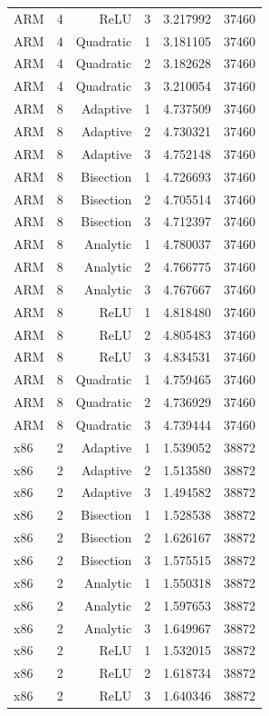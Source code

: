 {\begin{longtable}{lrrrrr}
ARM & 4 & ReLU & 3 & 3.217992 & 37460 \\
ARM & 4 & Quadratic & 1 & 3.181105 & 37460 \\
ARM & 4 & Quadratic & 2 & 3.182628 & 37460 \\
ARM & 4 & Quadratic & 3 & 3.210054 & 37460 \\
ARM & 8 & Adaptive & 1 & 4.737509 & 37460 \\
ARM & 8 & Adaptive & 2 & 4.730321 & 37460 \\
ARM & 8 & Adaptive & 3 & 4.752148 & 37460 \\
ARM & 8 & Bisection & 1 & 4.726693 & 37460 \\
ARM & 8 & Bisection & 2 & 4.705514 & 37460 \\
ARM & 8 & Bisection & 3 & 4.712397 & 37460 \\
ARM & 8 & Analytic & 1 & 4.780037 & 37460 \\
ARM & 8 & Analytic & 2 & 4.766775 & 37460 \\
ARM & 8 & Analytic & 3 & 4.767667 & 37460 \\
ARM & 8 & ReLU & 1 & 4.818480 & 37460 \\
ARM & 8 & ReLU & 2 & 4.805483 & 37460 \\
ARM & 8 & ReLU & 3 & 4.834531 & 37460 \\
ARM & 8 & Quadratic & 1 & 4.759465 & 37460 \\
ARM & 8 & Quadratic & 2 & 4.736929 & 37460 \\
ARM & 8 & Quadratic & 3 & 4.739444 & 37460 \\
x86 & 2 & Adaptive & 1 & 1.539052 & 38872 \\
x86 & 2 & Adaptive & 2 & 1.513580 & 38872 \\
x86 & 2 & Adaptive & 3 & 1.494582 & 38872 \\
x86 & 2 & Bisection & 1 & 1.528538 & 38872 \\
x86 & 2 & Bisection & 2 & 1.626167 & 38872 \\
x86 & 2 & Bisection & 3 & 1.575515 & 38872 \\
x86 & 2 & Analytic & 1 & 1.550318 & 38872 \\
x86 & 2 & Analytic & 2 & 1.597653 & 38872 \\
x86 & 2 & Analytic & 3 & 1.649967 & 38872 \\
x86 & 2 & ReLU & 1 & 1.532015 & 38872 \\
x86 & 2 & ReLU & 2 & 1.618734 & 38872 \\
x86 & 2 & ReLU & 3 & 1.640346 & 38872 \\

\end{longtable}}
